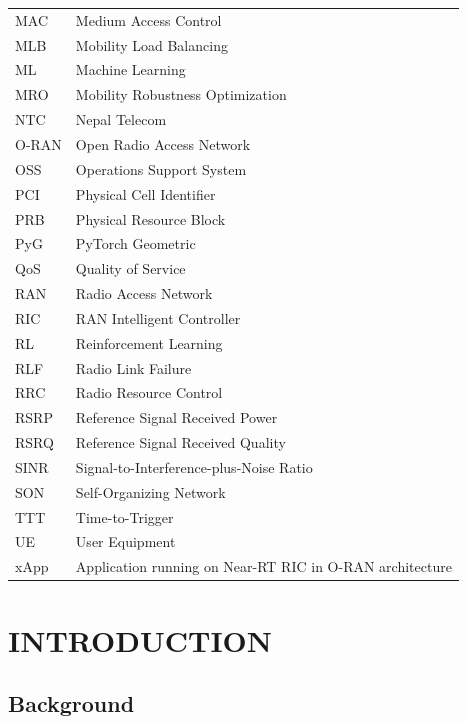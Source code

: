 \documentclass[12pt,a4paper,oneside]{report}
\begin{document}
\begin{center}
\begin{tabular}{ll}
MAC         & Medium Access Control\\
MLB         & Mobility Load Balancing\\
ML          & Machine Learning\\
MRO         & Mobility Robustness Optimization\\
NTC         & Nepal Telecom\\
O-RAN       & Open Radio Access Network\\
OSS         & Operations Support System\\
PCI         & Physical Cell Identifier\\
PRB         & Physical Resource Block\\
PyG         & PyTorch Geometric\\
QoS         & Quality of Service\\
RAN         & Radio Access Network\\
RIC         & RAN Intelligent Controller\\
RL          & Reinforcement Learning\\
RLF         & Radio Link Failure\\
RRC         & Radio Resource Control\\
RSRP        & Reference Signal Received Power\\
RSRQ        & Reference Signal Received Quality\\
SINR        & Signal-to-Interference-plus-Noise Ratio\\
SON         & Self-Organizing Network\\
TTT         & Time-to-Trigger\\
UE          & User Equipment\\
xApp        & Application running on Near-RT RIC in O-RAN architecture\\
\bottomrule
\end{tabular}
\end{center}

\clearpage
{}
\setcounter{page}{1}

\chapter{INTRODUCTION}

\section{Background}
\end{document}
